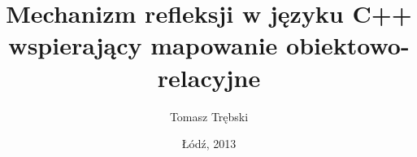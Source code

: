\title[Mechanizm refleksji w języku C++]{Mechanizm refleksji w języku C++ wspierający mapowanie obiektowo-relacyjne}
\author[Tomasz Trębski 165535]{Tomasz Trębski}
\date[2013]{Łódź, 2013}